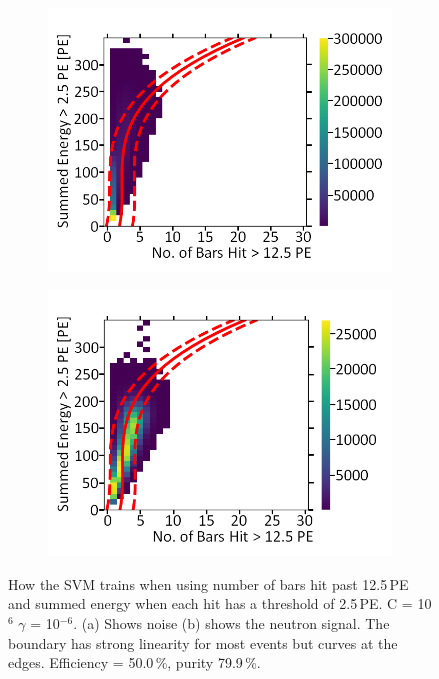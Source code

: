 \begin{figure}[!h]
\centering
\begin{subfigure}{.5\textwidth}
  \centering
  \includegraphics[width=\linewidth]{Appendix1/Figs/Bars2Sum1Noise.png}
  \captionsetup{width=.9\linewidth}
  \caption{}
  \label{subFig:Bars2Sum1Noise}
\end{subfigure}%
\begin{subfigure}{.5\textwidth}
  \centering
\includegraphics[width=\linewidth]{Appendix1/Figs/Bars2Sum1Signal.png}
  \captionsetup{width=.9\linewidth}
  \caption{}
  \label{subFig:Bars2Sum1Signal}
\end{subfigure}
\caption[LIBLINEAR SVM Nyström approximated RBF kernel for number of bars hit > 12.5\,PE vs summed energy > 2.5\,PE.]{How the SVM trains when using number of bars hit past 12.5\,PE and summed energy when each hit has a threshold of 2.5\,PE. C = 10$^6$ $\gamma$ = 10$^{-6}$. (a) Shows noise (b) shows the neutron signal. The boundary has strong linearity for most events but curves at the edges. Efficiency = 50.0\,\%, purity 79.9\,\%.}
\label{fig:Bars2Sum1SignalNoise}
\end{figure}

